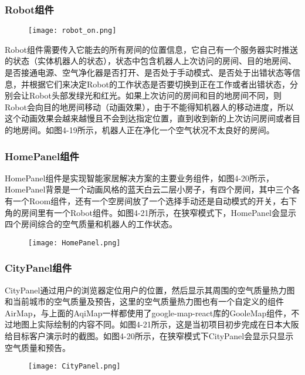 \subsubsection{Robot组件}
\begin{figure}[!htp]
 \centering
 \texttt{[image: robot\_on.png]}
\end{figure}
Robot组件需要传入它能去的所有房间的位置信息，它自己有一个服务器实时推送的状态（实体机器人的状态），状态中包含机器人上次访问的房间、目的地房间、是否接通电源、空气净化器是否打开、是否处于手动模式、是否处于出错状态等信息，并根据它们来决定Robot的工作状态是否要切换到正在工作或者出错状态，分别会让Robot头部发绿光和红光。如果上次访问的房间和目的地房间不同，则Robot会向目的地房间移动（动画效果），由于不能得知机器人的移动进度，所以这个动画效果会越来越慢且不会到达指定位置，直到收到新的上次访问房间或者目的地房间。如图4-19所示，机器人正在净化一个空气状况不太良好的房间。
\subsubsection{HomePanel组件}
HomePanel组件是实现智能家居解决方案的主要业务组件，如图4-20所示，HomePanel背景是一个动画风格的蓝天白云二层小房子，有四个房间，其中三个各有一个Room组件，还有一个空房间放了一个选择手动还是自动模式的开关，右下角的房间里有一个Robot组件。如图4-21所示，在狭窄模式下，HomePanel会显示四个房间综合的空气质量和机器人的工作状态。
\begin{figure}[!htp]
 \centering
 \texttt{[image: HomePanel.png]}
\end{figure}
\subsubsection{CityPanel组件}
CityPanel通过用户的浏览器定位用户的位置，然后显示其周围的空气质量热力图和当前城市的空气质量及预告，这里的空气质量热力图也有一个自定义的组件AirMap，与上面的AqiMap一样都使用了google-map-react库的GooleMap组件，不过地图上实际绘制的内容不同。如图4-21所示，这是当初项目初步完成在日本大阪给目标客户演示时的截图。如图4-20所示，在狭窄模式下CityPanel会显示只显示空气质量和预告。
\begin{figure}[!htp]
 \centering
 \texttt{[image: CityPanel.png]}
\end{figure}